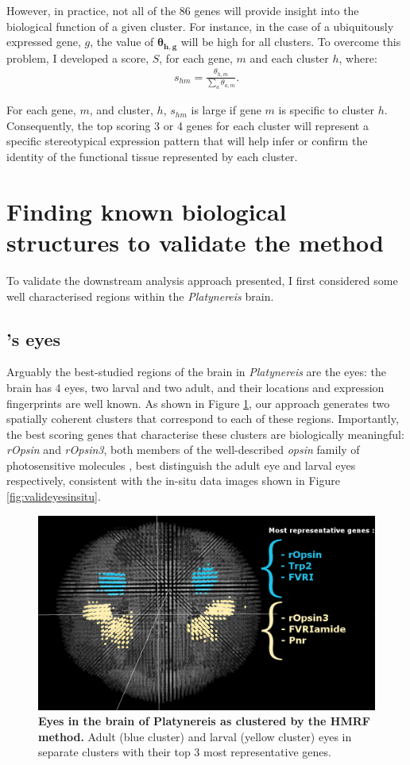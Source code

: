 	However, in practice, not all of the 86 genes will provide insight into the biological function of a given cluster. For instance, in the case of a ubiquitously expressed gene, $g$, the value of $\boldsymbol{\theta_{h,g}}$ will be high for all clusters. To overcome this problem, I developed a score, $S$, for each gene, $m$ and each cluster $h$, where:
\begin{align*}
s_{hm} = \frac{\theta_{h,m}}{\sum_{a} \theta_{a,m}}.
\end{align*}

For each gene, $m$, and cluster, $h$, $s_{hm}$ is large if gene $m$ is specific to cluster $h$. Consequently, the top scoring 3 or 4 genes for each cluster will represent a specific stereotypical expression pattern that will help infer or confirm the identity of the functional tissue represented by each cluster.

	\section{Finding known biological structures to validate the method}
	To validate the downstream analysis approach presented, I first considered some well characterised regions within the {\it{Platynereis}} brain.
		\subsection{\platy{}'s eyes}
		Arguably the best-studied regions of the brain in {\it{Platynereis}} are the eyes: the brain has 4 eyes, two larval and two adult, and their locations and expression fingerprints are well known. As shown in Figure \ref{fig:valideyesclust}, our approach generates two spatially coherent clusters that correspond to each of these regions. Importantly, the best scoring genes that characterise these clusters are biologically meaningful: {\it{rOpsin}} and {\it{rOpsin3}}, both members of the well-described \emph{opsin} family of photosensitive molecules \cite{terakita05,randel13}, best distinguish the adult eye and larval eyes respectively, consistent with the in-situ data images shown in Figure \ref{fig:valideyesinsitu}.
	\begin{figure}[H]
\centerline{\includegraphics[width=1\linewidth]{gfx/chapter6/eyes.png}}
\caption{{\bf Eyes in the brain of Platynereis as clustered by the HMRF method.} Adult (blue cluster) and larval (yellow cluster) eyes in separate clusters with their top 3 most representative genes.}
\label{fig:valideyesclust}
	\end{figure}
	
